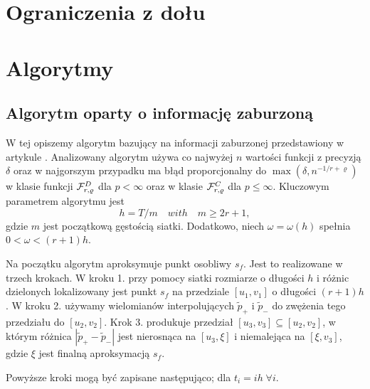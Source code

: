 \documentclass[oik, pdftex, robocza, man]{mgrwms}
\begin{document}
\mgrclosechapter




\chapter{Ograniczenia z dołu}


\mgrclosechapter



\chapter{Algorytmy}


\section{Algorytm oparty o informację zaburzoną}

W tej opiszemy algorytm bazujący na informacji zaburzonej przedstawiony w artykule \cite{AoP}. Analizowany algorytm używa co najwyżej $n$ wartości funkcji z precyzją $\delta $ oraz w najgorszym przypadku ma błąd proporcjonalny do $\max{(\delta, n^{-1 / r + \varrho })}$ w klasie funkcji $\mathcal{F}^D_{r,\varrho }$ dla $p < \infty$ oraz w klasie $\mathcal{F}^C_{r,\varrho }$ dla $p \leq \infty$. Kluczowym parametrem algorytmu jest
$$
    h = T / m \quad with \quad  m \geq 2r + 1,
$$
gdzie $m$ jest początkową gęstością siatki. Dodatkowo, niech $\omega  = \omega(h)$ spełnia $0 < \omega < (r + 1)h $.

Na początku algorytm aproksymuje punkt osobliwy $s_f$. Jest to realizowane w trzech krokach. W kroku 1. przy pomocy siatki rozmiarze o długości $h$ i różnic dzielonych lokalizowany jest punkt $s_f$ na przedziale $[u_1, v_1]$ o długości $(r + 1)h$. W kroku 2. używamy wielomianów interpolujących $\tilde{p}_+$ i $\tilde{p}_-$ do zwężenia tego przedziału do $[u_2, v_2]$. Krok 3. produkuje przedział $[u_3, v_3] \subseteq [u_2, v_2]$, w którym różnica $|\tilde{p}_{+} - \tilde{p}_{-}|$ jest nierosnąca na $[u_3, \xi]$ i niemalejąca na $[\xi, v_3]$, gdzie $\xi$ jest finalną aproksymacją $s_f$.

Powyższe kroki mogą być zapisane następująco; dla $t_i = ih \; \forall i$. \vspace{10pt}
\end{document}
